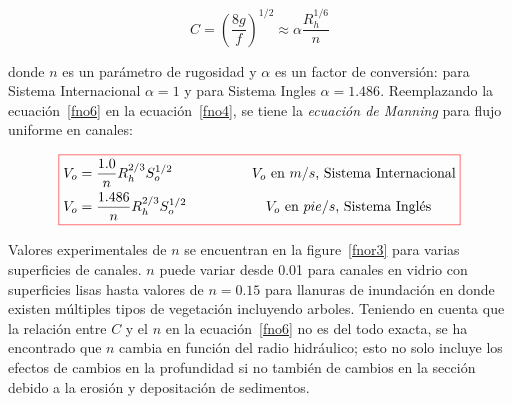 \documentclass[11pt, oneside]{article}
\begin{document}
\begin{equation}
C = \left( \frac{8g}{f} \right)^{1/2}  \approx \alpha \frac{R_h^{1/6}}{n}
\label{fno6}
\end{equation}

donde $n$ es un par\'ametro de rugosidad y $\alpha$ es un factor de conversi\'on: para Sistema Internacional $\alpha = 1$ y para Sistema Ingles $\alpha=1.486$. Reemplazando la ecuaci\'on~\ref{fno6} en la ecuaci\'on~\ref{fno4}, se tiene la \emph{ecuaci\'on de Manning} para flujo uniforme en canales:

\begin{equation}
\color{red}\boxed{\color{black}
\begin{split}
& V_o = \frac{1.0}{n} R_h^{2/3} S_o^{1/2} \hspace{2cm} \text{$V_o$ en $m/s$, Sistema Internacional}\\
& V_o = \frac{1.486}{n} R_h^{2/3} S_o^{1/2} \hspace{2cm} \text{$V_o$ en $pie/s$, Sistema Ingl\'es}
\end{split}
}
\label{fno7}
\end{equation}

Valores experimentales de $n$ se encuentran en la figure~\ref{fnor3} para varias superficies de canales. $n$ puede variar desde 0.01 para canales en vidrio con superficies lisas hasta valores de $n=0.15$ para llanuras de inundaci\'on en donde existen m\'ultiples tipos de vegetaci\'on incluyendo arboles. Teniendo en cuenta que la relaci\'on entre $C$ y el $n$ en la ecuaci\'on~\ref{fno6} no es del todo exacta, se ha encontrado que $n$ cambia en funci\'on del radio hidr\'aulico; esto no solo incluye los efectos de cambios en la profundidad si no tambi\'en de cambios en la secci\'on debido a la erosi\'on y depositaci\'on de sedimentos.   
\end{document}
